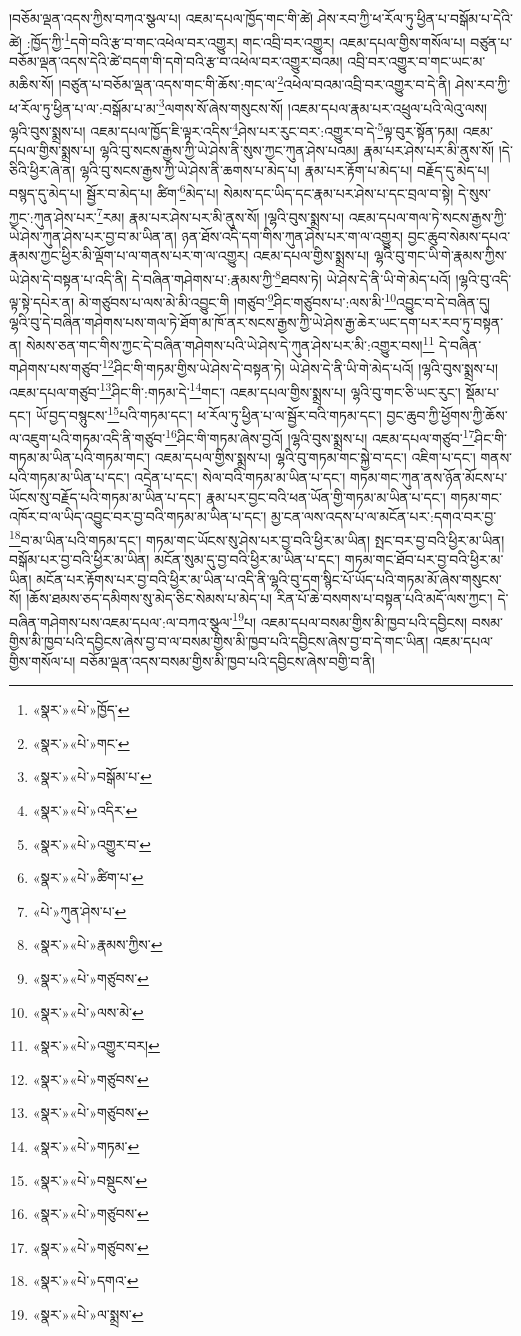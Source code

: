 །བཅོམ་ལྡན་འདས་ཀྱིས་བཀའ་སྩལ་པ། འཇམ་དཔལ་ཁྱོད་གང་གི་ཚེ། ཤེས་རབ་ཀྱི་ཕ་རོལ་ཏུ་ཕྱིན་པ་བསྒོམ་པ་དེའི་ཚེ། :ཁྱོད་ཀྱི་\footnote{«སྣར་»«པེ་»ཁྱོད་}དགེ་བའི་རྩ་བ་གང་འཕེལ་བར་འགྱུར། གང་འབྲི་བར་འགྱུར། འཇམ་དཔལ་གྱིས་གསོལ་པ། བཙུན་པ་བཅོམ་ལྡན་འདས་དེའི་ཚེ་བདག་གི་དགེ་བའི་རྩ་བ་འཕེལ་བར་འགྱུར་བའམ། འབྲི་བར་འགྱུར་བ་གང་ཡང་མ་མཆིས་སོ། །བཙུན་པ་བཅོམ་ལྡན་འདས་གང་གི་ཆོས་:གང་ལ་\footnote{«སྣར་»«པེ་»གང་}འཕེལ་བའམ་འབྲི་བར་འགྱུར་བ་དེ་ནི། ཤེས་རབ་ཀྱི་ཕ་རོལ་ཏུ་ཕྱིན་པ་ལ་:བསྒོམ་པ་མ་\footnote{«སྣར་»«པེ་»བསྒོམ་པ་}ལགས་སོ་ཞེས་གསུངས་སོ། །འཇམ་དཔལ་རྣམ་པར་འཕྲུལ་པའི་ལེའུ་ལས། ལྷའི་བུས་སྨྲས་པ། འཇམ་དཔལ་ཁྱོད་ཇི་ལྟར་འདིས་\footnote{«སྣར་»«པེ་»འདིར་}ཤེས་པར་རུང་བར་:འགྱུར་བ་དེ་\footnote{«སྣར་»«པེ་»འགྱུར་བ་}ལྟ་བུར་སྟོན་ཏམ། འཇམ་དཔལ་གྱིས་སྨྲས་པ། ལྷའི་བུ་སངས་རྒྱས་ཀྱི་ཡེ་ཤེས་ནི་སུས་ཀྱང་ཀུན་ཤེས་པའམ། རྣམ་པར་ཤེས་པར་མི་ནུས་སོ། །དེ་ཅིའི་ཕྱིར་ཞེ་ན། ལྷའི་བུ་སངས་རྒྱས་ཀྱི་ཡེ་ཤེས་ནི་ཆགས་པ་མེད་པ། རྣམ་པར་རྟོག་པ་མེད་པ། བརྗོད་དུ་མེད་པ། བསྙད་དུ་མེད་པ། སྦྱོར་བ་མེད་པ། ཚིག་\footnote{«སྣར་»«པེ་»ཚིག་པ་}མེད་པ། སེམས་དང་ཡིད་དང་རྣམ་པར་ཤེས་པ་དང་བྲལ་བ་སྟེ། དེ་སུས་ཀྱང་:ཀུན་ཤེས་པར་\footnote{«པེ་»ཀུན་ཤེས་པ་}རམ། རྣམ་པར་ཤེས་པར་མི་ནུས་སོ། །ལྷའི་བུས་སྨྲས་པ། འཇམ་དཔལ་གལ་ཏེ་སངས་རྒྱས་ཀྱི་ཡེ་ཤེས་ཀུན་ཤེས་པར་བྱ་བ་མ་ཡིན་ན། ཉན་ཐོས་འདི་དག་གིས་ཀུན་ཤེས་པར་ག་ལ་འགྱུར། བྱང་ཆུབ་སེམས་དཔའ་རྣམས་ཀྱང་ཕྱིར་མི་ལྡོག་པ་ལ་གནས་པར་ག་ལ་འགྱུར། འཇམ་དཔལ་གྱིས་སྨྲས་པ། ལྷའི་བུ་གང་ཡི་གེ་རྣམས་ཀྱིས་ཡེ་ཤེས་དེ་བསྟན་པ་འདི་ནི། དེ་བཞིན་གཤེགས་པ་:རྣམས་ཀྱི་\footnote{«སྣར་»«པེ་»རྣམས་ཀྱིས་}ཐབས་ཏེ། ཡེ་ཤེས་དེ་ནི་ཡི་གེ་མེད་པའོ། །ལྷའི་བུ་འདི་ལྟ་སྟེ་དཔེར་ན། མེ་གཙུབས་པ་ལས་མེ་མི་འབྱུང་གི །གཙུབ་\footnote{«སྣར་»«པེ་»གཙུབས་}ཤིང་གཙུབས་པ་:ལས་མི་\footnote{«སྣར་»«པེ་»ལས་མེ་}འབྱུང་བ་དེ་བཞིན་དུ། ལྷའི་བུ་དེ་བཞིན་གཤེགས་པས་གལ་ཏེ་ཐོག་མ་ཁོ་ནར་སངས་རྒྱས་ཀྱི་ཡེ་ཤེས་རྒྱ་ཆེར་ཡང་དག་པར་རབ་ཏུ་བསྟན་ན། སེམས་ཅན་གང་གིས་ཀྱང་དེ་བཞིན་གཤེགས་པའི་ཡེ་ཤེས་དེ་ཀུན་ཤེས་པར་མི་:འགྱུར་བས།\footnote{«སྣར་»«པེ་»འགྱུར་བར།} དེ་བཞིན་གཤེགས་པས་གཙུབ་\footnote{«སྣར་»«པེ་»གཙུབས་}ཤིང་གི་གཏམ་གྱིས་ཡེ་ཤེས་དེ་བསྟན་ཏེ། ཡེ་ཤེས་དེ་ནི་ཡི་གེ་མེད་པའོ། །ལྷའི་བུས་སྨྲས་པ། འཇམ་དཔལ་གཙུབ་\footnote{«སྣར་»«པེ་»གཙུབས་}ཤིང་གི་:གཏམ་དེ་\footnote{«སྣར་»«པེ་»གཏམ་}གང་། འཇམ་དཔལ་གྱིས་སྨྲས་པ། ལྷའི་བུ་གང་ཅི་ཡང་རུང་། སྡོམ་པ་དང་། ཡོ་བྱད་བསྙུངས་\footnote{«སྣར་»«པེ་»བསྡུངས་}པའི་གཏམ་དང་། ཕ་རོལ་ཏུ་ཕྱིན་པ་ལ་སྦྱོར་བའི་གཏམ་དང་། བྱང་ཆུབ་ཀྱི་ཕྱོགས་ཀྱི་ཆོས་ལ་འཇུག་པའི་གཏམ་འདི་ནི་གཙུབ་\footnote{«སྣར་»«པེ་»གཙུབས་}ཤིང་གི་གཏམ་ཞེས་བྱའོ། །ལྷའི་བུས་སྨྲས་པ། འཇམ་དཔལ་གཙུབ་\footnote{«སྣར་»«པེ་»གཙུབས་}ཤིང་གི་གཏམ་མ་ཡིན་པའི་གཏམ་གང་། འཇམ་དཔལ་གྱིས་སྨྲས་པ། ལྷའི་བུ་གཏམ་གང་སྐྱེ་བ་དང་། འཇིག་པ་དང་། གནས་པའི་གཏམ་མ་ཡིན་པ་དང་། འདྲེན་པ་དང་། སེལ་བའི་གཏམ་མ་ཡིན་པ་དང་། གཏམ་གང་ཀུན་ནས་ཉོན་མོངས་པ་ཡོངས་སུ་བརྗོད་པའི་གཏམ་མ་ཡིན་པ་དང་། རྣམ་པར་བྱང་བའི་ཕན་ཡོན་གྱི་གཏམ་མ་ཡིན་པ་དང་། གཏམ་གང་འཁོར་བ་ལ་ཡིད་འབྱུང་བར་བྱ་བའི་གཏམ་མ་ཡིན་པ་དང་། མྱ་ངན་ལས་འདས་པ་ལ་མངོན་པར་:དགའ་བར་བྱ་\footnote{«སྣར་»«པེ་»དགའ་}བ་མ་ཡིན་པའི་གཏམ་དང་། གཏམ་གང་ཡོངས་སུ་ཤེས་པར་བྱ་བའི་ཕྱིར་མ་ཡིན། སྤང་བར་བྱ་བའི་ཕྱིར་མ་ཡིན། བསྒོམ་པར་བྱ་བའི་ཕྱིར་མ་ཡིན། མངོན་སུམ་དུ་བྱ་བའི་ཕྱིར་མ་ཡིན་པ་དང་། གཏམ་གང་ཐོབ་པར་བྱ་བའི་ཕྱིར་མ་ཡིན། མངོན་པར་རྟོགས་པར་བྱ་བའི་ཕྱིར་མ་ཡིན་པ་འདི་ནི་ལྷའི་བུ་དག་སྙིང་པོ་ཡོད་པའི་གཏམ་མོ་ཞེས་གསུངས་སོ། །ཆོས་ཐམས་ཅད་དམིགས་སུ་མེད་ཅིང་སེམས་པ་མེད་པ། རིན་པོ་ཆེ་བསགས་པ་བསྟན་པའི་མདོ་ལས་ཀྱང་། དེ་བཞིན་གཤེགས་པས་འཇམ་དཔལ་:ལ་བཀའ་སྩལ་\footnote{«སྣར་»«པེ་»ལ་སྨྲས་}པ། འཇམ་དཔལ་བསམ་གྱིས་མི་ཁྱབ་པའི་དབྱིངས། བསམ་གྱིས་མི་ཁྱབ་པའི་དབྱིངས་ཞེས་བྱ་བ་ལ་བསམ་གྱིས་མི་ཁྱབ་པའི་དབྱིངས་ཞེས་བྱ་བ་དེ་གང་ཡིན། འཇམ་དཔལ་གྱིས་གསོལ་པ། བཅོམ་ལྡན་འདས་བསམ་གྱིས་མི་ཁྱབ་པའི་དབྱིངས་ཞེས་བགྱི་བ་ནི། 